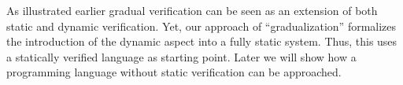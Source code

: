 
As illustrated earlier %
gradual verification can be seen as an extension of both static and dynamic verification.
Yet, our approach of “gradualization” formalizes the introduction of the dynamic aspect into a fully static system.
Thus, this %
uses a statically verified language as starting point.
Later %
we will show how a programming language without static verification can be approached.


